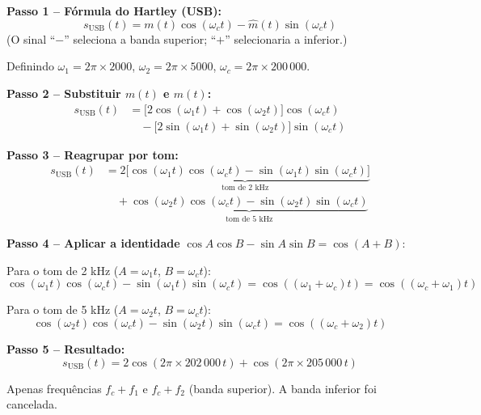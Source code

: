 \documentclass[11pt,a4paper]{article}
\begin{document}
\begin{resolucao}

\textbf{Passo 1 -- Fórmula do Hartley (USB):}
\[
  s_{\text{USB}}(t) = m(t)\cos(\omega_c t) - \hat{m}(t)\sin(\omega_c t)
\]
(O sinal ``$-$'' seleciona a banda superior; ``$+$'' selecionaria a inferior.)

Definindo $\omega_1 = 2\pi \times 2000$, $\omega_2 = 2\pi \times 5000$, $\omega_c = 2\pi \times 200\,000$.

\textbf{Passo 2 -- Substituir $m(t)$ e $\hat{m}(t)$:}
\begin{align*}
  s_{\text{USB}}(t) &= \big[2\cos(\omega_1 t) + \cos(\omega_2 t)\big]\cos(\omega_c t) \\
  &\quad - \big[2\sin(\omega_1 t) + \sin(\omega_2 t)\big]\sin(\omega_c t)
\end{align*}

\textbf{Passo 3 -- Reagrupar por tom:}
\begin{align*}
  s_{\text{USB}}(t) &= \underbrace{2\big[\cos(\omega_1 t)\cos(\omega_c t) - \sin(\omega_1 t)\sin(\omega_c t)\big]}_{\text{tom de 2 kHz}} \\
  &\quad + \underbrace{\cos(\omega_2 t)\cos(\omega_c t) - \sin(\omega_2 t)\sin(\omega_c t)}_{\text{tom de 5 kHz}}
\end{align*}

\textbf{Passo 4 -- Aplicar a identidade} $\cos A \cos B - \sin A \sin B = \cos(A + B)$:

Para o tom de 2 kHz ($A = \omega_1 t$, $B = \omega_c t$):
\[
  \cos(\omega_1 t)\cos(\omega_c t) - \sin(\omega_1 t)\sin(\omega_c t) = \cos((\omega_1 + \omega_c)t) = \cos((\omega_c + \omega_1)t)
\]

Para o tom de 5 kHz ($A = \omega_2 t$, $B = \omega_c t$):
\[
  \cos(\omega_2 t)\cos(\omega_c t) - \sin(\omega_2 t)\sin(\omega_c t) = \cos((\omega_c + \omega_2)t)
\]

\textbf{Passo 5 -- Resultado:}
\[
  \boxed{s_{\text{USB}}(t) = 2\cos(2\pi \times 202\,000\,t) + \cos(2\pi \times 205\,000\,t)}
\]

Apenas frequências $f_c + f_1$ e $f_c + f_2$ (banda superior). A banda inferior foi cancelada.
\end{resolucao}
\end{document}
